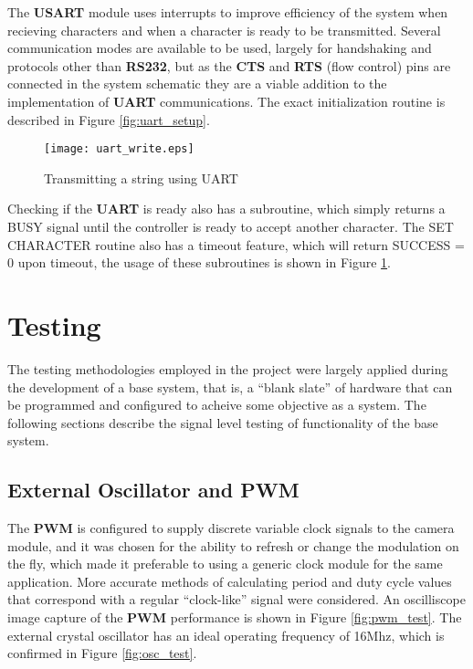 \documentclass[11pt, a4paper, oneside]{Thesis} %
\begin{document}
The \textbf{USART} module uses interrupts to improve efficiency of the system when recieving characters and when a character is ready to be transmitted. Several communication modes are available to be used, largely for handshaking and protocols other than \textbf{RS232}, but as the \textbf{CTS} and \textbf{RTS} (flow control) pins are connected in the system schematic they are a viable addition to the implementation of \textbf{UART} communications. The exact initialization routine is described in Figure \ref{fig:uart_setup}.

\begin{figure}[h]
  \begin{center}
    \texttt{[image: uart\_write.eps]}
  \end{center}
  \caption{Transmitting a string using UART}
  \label{fig:uart_write}
\end{figure}

Checking if the \textbf{UART} is ready also has a subroutine, which simply returns a BUSY signal until the controller is ready to accept another character. The SET CHARACTER routine also has a timeout feature, which will return SUCCESS = 0 upon timeout, the usage of these subroutines is shown in Figure \ref{fig:uart_write}.

\chapter{Testing}
\label{chap:testing} %
The testing methodologies employed in the project were largely applied during the development of a base system, that is, a ``blank slate'' of hardware that can be programmed and configured to acheive some objective as a system. The following sections describe the signal level testing of functionality of the base system.

\section{External Oscillator and PWM}
The \textbf{PWM} is configured to supply discrete variable clock signals to the camera module, and it was chosen for the ability to refresh or change the modulation on the fly, which made it preferable to using a generic clock module for the same application. More accurate methods of calculating period and duty cycle values that correspond with a regular ``clock-like'' signal were considered. An oscilliscope image capture of the \textbf{PWM} performance is shown in Figure \ref{fig:pwm_test}. The external crystal oscillator has an ideal operating frequency of 16Mhz, which is confirmed in Figure \ref{fig:osc_test}. 
\end{document}
